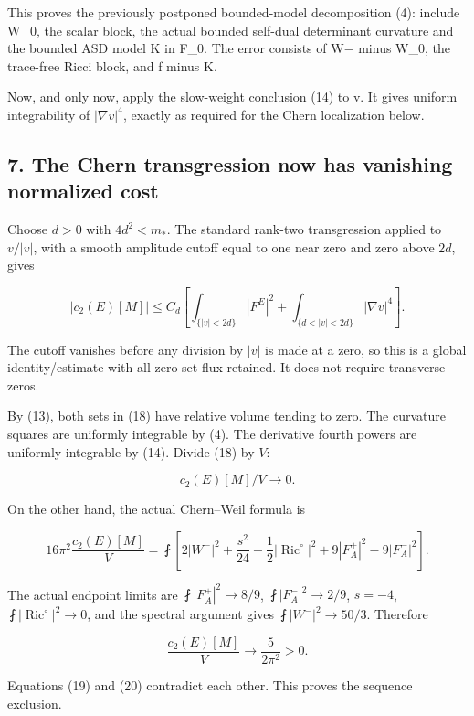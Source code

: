 This proves the previously postponed bounded-model decomposition (4):
include W\_0, the scalar block, the actual bounded self-dual determinant
curvature and the bounded ASD model K in F\_0. The error consists of W−
minus W\_0, the trace-free Ricci block, and f minus K.

Now, and only now, apply the slow-weight conclusion (14) to v. It gives
uniform integrability of \(|\nabla v|^4\), exactly as required for the
Chern localization below.

\hypertarget{o10strength:the-chern-transgression-now-has-vanishing-normalized-cost}{%
\subsection{7. The Chern transgression now has vanishing normalized
cost}\label{o10strength:the-chern-transgression-now-has-vanishing-normalized-cost}}

Choose \(d>0\) with \(4d^2<m_*\). The standard rank-two transgression
applied to \(v/|v|\), with a smooth amplitude cutoff equal to one near
zero and zero above \(2d\), gives

\[
 |c_2(E)[M]|
 \le C_d\left[
 \int_{\{|v|<2d\}}|F^E|^2+
 \int_{\{d<|v|<2d\}}|\nabla v|^4\right].
\tag{18}
\]

The cutoff vanishes before any division by \(|v|\) is made at a zero, so
this is a global identity/estimate with all zero-set flux retained. It
does not require transverse zeros.

By (13), both sets in (18) have relative volume tending to zero. The
curvature squares are uniformly integrable by (4). The derivative fourth
powers are uniformly integrable by (14). Divide (18) by \(V\):

\[
 \boxed{c_2(E)[M]/V\longrightarrow0.}\tag{19}
\]

On the other hand, the actual Chern--Weil formula is

\[
 16\pi^2\frac{c_2(E)[M]}V
 =\fint\left[
 2|W^-|^2+\frac{s^2}{24}
 -\frac12|\operatorname{Ric}^{\circ}|^2
 +9|F_A^+|^2-9|F_A^-|^2\right].
\]

The actual endpoint limits are \(\fint|F_A^+|^2\to8/9\),
\(\fint|F_A^-|^2\to2/9\), \(s=-4\),
\(\fint|\operatorname{Ric}^{\circ}|^2\to0\), and the spectral argument
gives \(\fint|W^-|^2\to50/3\). Therefore

\[
 \boxed{\frac{c_2(E)[M]}V\longrightarrow
                   \frac{5}{2\pi^2}>0.}\tag{20}
\]

Equations (19) and (20) contradict each other. This proves the sequence
exclusion.

